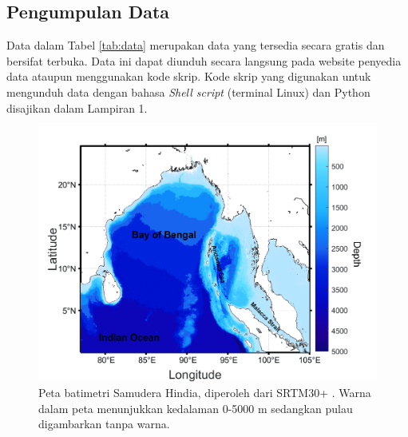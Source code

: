 \begin{spacing}{1.5}
	\subsection[Pengumpulan Data]{Pengumpulan Data}
	Data dalam Tabel \ref{tab:data} merupakan data yang tersedia secara gratis dan bersifat terbuka. Data ini dapat diunduh secara langsung pada website penyedia data ataupun menggunakan kode skrip. Kode skrip yang digunakan untuk mengunduh data dengan bahasa \textit{Shell script} (terminal Linux) dan Python disajikan dalam Lampiran 1.
	
	\begin{figure}[H]
		\centering
		\includegraphics[width=12cm]{contents/Figures/Batimetri_edit_compress}
		\caption{Peta batimetri Samudera Hindia, diperoleh dari SRTM30+ \protect\cite{becker2009global}. Warna dalam peta menunjukkan kedalaman 0-5000 m sedangkan pulau digambarkan tanpa warna.}
		\label{fig:domain}
	\end{figure}
\end{spacing}
\vspace{-0.5pc}
